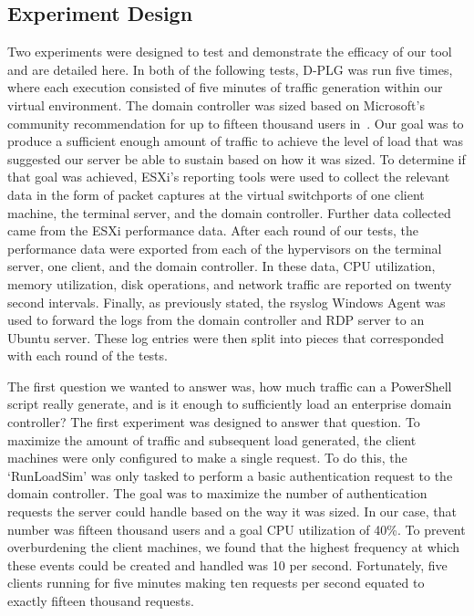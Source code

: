 \subsection{Experiment Design} \label{sec:experimentDesign}
\noindent Two experiments were designed to test and demonstrate the efficacy
of our tool and are detailed here.  In both of the following tests, D-PLG was
run five times, where each execution consisted of five minutes of traffic
generation within our virtual environment.  The domain controller was sized
based on Microsoft's community recommendation for up to fifteen thousand users
in~\cite{mak12}.  Our goal was to produce a sufficient enough amount of traffic
to achieve the level of load that was suggested our server be able to sustain
based on how it was sized.  To determine if that goal was achieved, ESXi's
reporting tools were used to collect the relevant data in the form of packet
captures at the virtual switchports of one client machine, the terminal server,
and the domain controller.  Further data collected came from the ESXi
performance data.  After each round of our tests, the performance data were
exported from each of the hypervisors on the terminal server, one client, and
the domain controller.  In these data, CPU utilization, memory utilization,
disk operations, and network traffic are reported on twenty second intervals.
Finally, as previously stated, the rsyslog Windows Agent was used to forward
the logs from the domain controller and RDP server to an Ubuntu server.  These
log entries were then split into pieces that corresponded with each round of
the tests.

The first question we wanted to answer was, how much traffic can a PowerShell
script really generate, and is it enough to sufficiently load an enterprise
domain controller?  The first experiment was designed to answer that question.
To maximize the amount of traffic and subsequent load generated, the client
machines were only configured to make a single request.  To do this, the
`RunLoadSim' was only tasked to perform a basic authentication request to the
domain controller.  The goal was to maximize the number of authentication
requests the server could handle based on the way it was sized.  In our case,
that number was fifteen thousand users and a goal CPU utilization of 40\%.  To
prevent overburdening the client machines, we found that the highest frequency
at which these events could be created and handled was 10 per second.
Fortunately, five clients running for five minutes making ten requests per
second equated to exactly fifteen thousand requests.  

